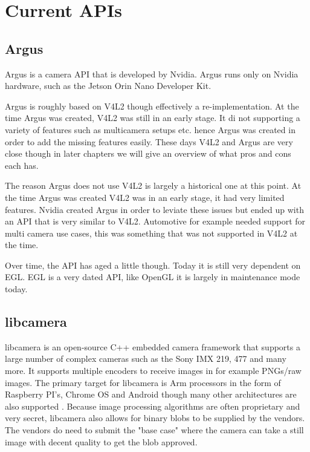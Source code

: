 \chapter{Current APIs\label{section:currentAPIs}}
\section{Argus}

Argus is a camera API that is developed by Nvidia. Argus runs only on Nvidia
hardware, such as the Jetson Orin Nano Developer Kit.

Argus is roughly based on V4L2 though effectively a re-implementation. At the
time Argus was created, V4L2 was still in an early stage. It di not supporting
a variety of features such as multicamera setups etc. hence Argus was created
in order to add the missing features easily. These days V4L2 and Argus are very
close though in later chapters we will give an overview of what pros and cons
each has.

The reason Argus does not use V4L2 is largely a historical one at this point.
At the time Argus was created V4L2 was in an early stage, it had very limited
features. Nvidia created Argus in order to leviate these issues but ended up
with an API that is very similar to V4L2. Automotive for example needed support
for multi camera use cases, this was something that was not supported in V4L2 at
the time.

Over time, the API has aged a little though. Today it is still very dependent on
EGL. EGL is a very dated API, like OpenGL it is largely in maintenance mode
today.

\section{libcamera}
libcamera is an open-source C++ embedded camera framework that supports a large
number of complex cameras such as the Sony IMX 219, 477 and many more. It
supports multiple encoders to receive images in for example PNGs/raw images.
The primary target for libcamera is Arm processors in the form of Raspberry
PI's, Chrome OS and Android though many other architectures are also supported
\cite{libcameraStack}. Because image processing algorithms are often
proprietary and very secret, libcamera also allows for binary blobs to be
supplied by the vendors. The vendors do need to submit the "base case" where
the camera can take a still image with decent quality to get the blob approved.

